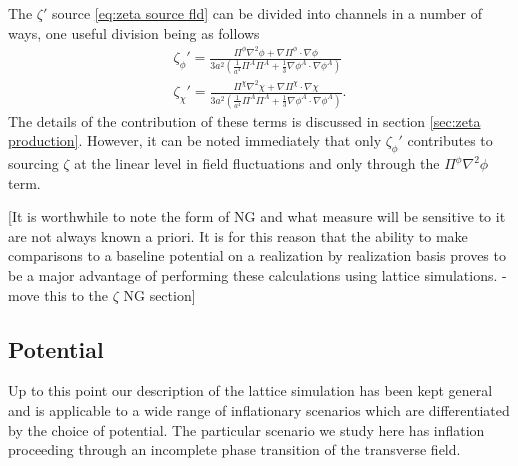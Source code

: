 The $\zeta'$ source \eqref{eq:zeta source fld} can be divided into channels in a number of ways, one useful division being as follows
\begin{align}
  \zeta_\phi' = \frac{\Pi^\phi\nabla^2\phi + \nabla\Pi^\phi\cdot\nabla\phi}{3a^2\left(\frac{1}{a^4}\Pi^A\Pi^A + \frac{1}{3}\nabla\phi^A\cdot\nabla\phi^A \right)} \\
  \zeta_\chi' = \frac{\Pi^\chi\nabla^2\chi + \nabla\Pi^\chi\cdot\nabla\chi}{3a^2\left(\frac{1}{a^4}\Pi^A\Pi^A + \frac{1}{3}\nabla\phi^A\cdot\nabla\phi^A \right)}.
\end{align}
The details of the contribution of these terms is discussed in section \ref{sec:zeta production}.
However, it can be noted immediately that only $\zeta_\phi'$ contributes to sourcing $\zeta$ at the linear level in field fluctuations and only through the $\Pi^\phi\nabla^2\phi$ term.

[It is worthwhile to note the form of NG and what measure will be sensitive to it are not always known a priori.
It is for this reason that the ability to make comparisons to a baseline potential on a realization by realization basis proves to be a major advantage of performing these calculations using lattice simulations. - move this to the $\zeta$ NG section]


\subsection{Potential} \label{sec:potential}
Up to this point our description of the lattice simulation has been kept general and is applicable to a wide range of inflationary scenarios which are differentiated by the choice of potential. The particular scenario we study here has inflation proceeding through an incomplete phase transition of the transverse field. 


